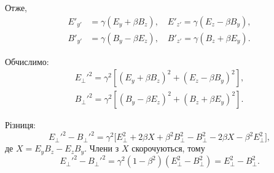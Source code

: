 \begin{problem}
\begin{itemize}
              Отже,
              \begin{equation*}
                  \begin{aligned}
                      E'_{y'} & = \gamma (E_y + \beta B_z), \quad E'_{z'} = \gamma (E_z - \beta B_y), \\
                      B'_{y'} & = \gamma (B_y - \beta E_z), \quad B'_{z'} = \gamma (B_z + \beta E_y).
                  \end{aligned}
              \end{equation*}

              Обчислимо:
              \begin{align*}
                  E_\perp'^2 = \gamma^2 \left[ (E_y + \beta B_z)^2 + (E_z - \beta B_y)^2 \right], \\
                  B_\perp'^2 = \gamma^2 \left[ (B_y - \beta E_z)^2 + (B_z + \beta E_y)^2 \right].
              \end{align*}

              Різниця:
              \begin{equation*}
                  E_\perp'^2 - B_\perp'^2 = \gamma^2 \bigl[ E_\perp^2 + 2\beta X + \beta^2 B_\perp^2 - B_\perp^2 - 2\beta X - \beta^2 E_\perp^2 \bigr],
              \end{equation*}
              де \(X = E_y B_z - E_z B_y\). Члени з \(X\) скорочуються, тому
              \begin{equation*}
                  E_\perp'^2 - B_\perp'^2 = \gamma^2 (1 - \beta^2)(E_\perp^2 - B_\perp^2) = E_\perp^2 - B_\perp^2.
              \end{equation*}


\end{itemize}
\end{problem}
